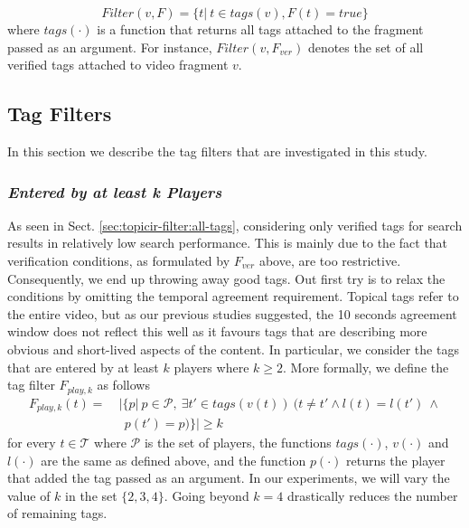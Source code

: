 \begin{equation}
Filter(v, F) = \{t |~t \in tags(v), F(t) = true\}
\end{equation}
where $tags(\cdot)$ is a function that returns all tags attached to the fragment passed as an argument.
For instance, $Filter(v, F_{ver})$ denotes the set of all verified tags attached to video fragment $v$.



\subsection{Tag Filters}\label{filter:sec:filters}
In this section we describe the tag filters that are investigated in this study.

\subsubsection{\textit{Entered by at least \textbf{k} Players}}
As seen in Sect. \ref{sec:topicir-filter:all-tags}, considering only verified tags for search results in relatively low search performance. This is mainly due to the fact that verification conditions, as formulated by $F_{ver}$ above, are too restrictive. Consequently, we end up throwing away good tags. Out first try is to relax the conditions by omitting the temporal agreement requirement. Topical tags refer to the entire video, but as our previous studies suggested, the 10 seconds agreement window does not reflect this well as it favours tags that are describing more obvious and short-lived aspects of the content. In particular, we consider the tags that are entered by at least $k$ players where $k\geq2$. More formally, we define the tag filter $F_{play,k}$ as follows
\begin{align}
F_{play,k}(t) = &~|\{p|~p \in \mathcal{P},~\exists t' \in tags(v(t))~(t\neq t' \wedge l(t) = l(t')~\wedge \nonumber\\
			  & ~~~ p(t') = p)\}| \geq k 
\end{align}
for every $t \in \mathcal{T}$ where $\mathcal{P}$ is the set of players, the functions $tags(\cdot)$, $v(\cdot)$ and $l(\cdot)$ are the same as defined above, and the function $p(\cdot)$ returns the player that added the tag passed as an argument. In our experiments, we will vary the value of $k$ in the set $\{2,3,4\}$. Going beyond $k=4$ drastically reduces the number of remaining tags.

